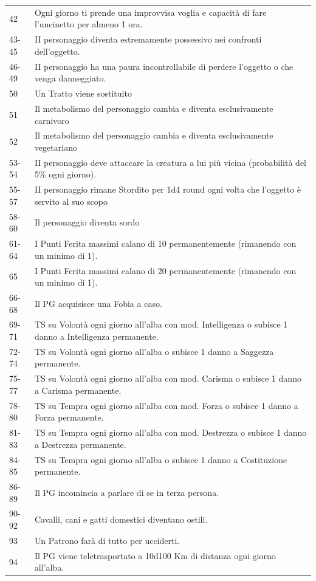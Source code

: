 {\begin{tabularx}{0.95\textwidth}{lX}
42& Ogni giorno ti prende una improvvisa voglia e capacità di fare l'uncinetto per almeno 1 ora.\\
43-45   & II personaggio diventa estremamente possessivo nei confronti dell'oggetto.\\
46-49   & II personaggio ha una paura incontrollabile di perdere l'oggetto o che venga danneggiato.\\
50      & Un Tratto viene sostituito\\
51& Il metabolismo del personaggio cambia e diventa esclusivamente carnivoro\\
52& Il metabolismo del personaggio cambia e diventa esclusivamente vegetariano\\
53-54   & II personaggio deve attaccare la creatura a lui più vicina (probabilità del 5\% ogni giorno).\\
55-57   & II personaggio rimane Stordito per 1d4 round ogni volta che l'oggetto è servito al suo scopo\\
58-60   & Il personaggio diventa sordo\\
61-64   & I Punti Ferita massimi calano di 10 permanentemente (rimanendo con un minimo di 1).\\
65      & I Punti Ferita massimi calano di 20 permanentemente (rimanendo con un minimo di 1).\\
66-68   & Il PG acquisisce una Fobia a caso.\\
69-71   & TS su Volontà ogni giorno all'alba con mod. Intelligenza o subisce 1 danno a Intelligenza permanente.\\
72-74   & TS su Volontà ogni giorno all'alba o subisce 1 danno a Saggezza permanente.\\
75-77   & TS su Volontà ogni giorno all'alba con mod. Carisma o subisce 1 danno a Carisma permanente.\\
78-80   & TS su Tempra ogni giorno all'alba con mod. Forza o subisce 1 danno a Forza permanente.\\
81-83   & TS su Tempra ogni giorno all'alba con mod. Destrezza o subisce 1 danno a Destrezza permanente.\\
84-85   & TS su Tempra ogni giorno all'alba o subisce 1 danno a Costituzione permanente.\\
86-89& Il PG incomincia a parlare di se in terza persona.\\
90-92& Cavalli, cani e gatti domestici diventano ostili.\\
93& Un Patrono farà di tutto per ucciderti.\\
94      & Il PG viene teletrasportato a 10d100 Km di distanza ogni giorno all'alba.\\

\end{tabularx}}
